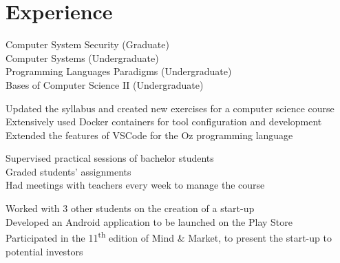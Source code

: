 \documentclass[]{deedy-resume-openfont}
\begin{document}
\begin{minipage}[t]{0.60\textwidth} 


\section{Experience}

\textbullet{} Computer System Security (Graduate) \\
\textbullet{} Computer Systems (Undergraduate) \\
\textbullet{} Programming Languages Paradigms (Undergraduate) \\
\textbullet{} Bases of Computer Science II (Undergraduate) \\
\sectionsep

\textbullet{} Updated the syllabus and created new exercises for a computer science course \\
\textbullet{} Extensively used Docker containers for tool configuration and development \\
\textbullet{} Extended the features of VSCode for the Oz programming language \\
\sectionsep

\textbullet{} Supervised practical sessions of bachelor students \\
\textbullet{} Graded students' assignments \\
\textbullet{} Had meetings with teachers every week to manage the course \\
\sectionsep

\textbullet{} Worked with 3 other students on the creation of a start-up \\
\textbullet{} Developed an Android application to be launched on the Play Store \\
\textbullet{} Participated in the 11\textsuperscript{th} edition of Mind \& Market, to present the start-up to potential investors \\
\sectionsep



\end{minipage}
\end{document}
